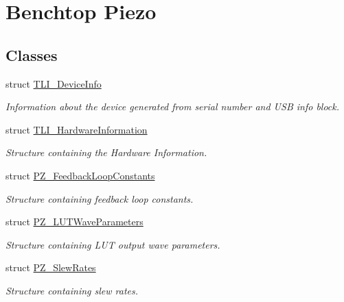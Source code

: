 \hypertarget{group___benchtop_piezo}{}\section{Benchtop Piezo}
\label{group___benchtop_piezo}
\subsection*{Classes}
\begin{DoxyCompactItemize}
\item 
struct \hyperlink{struct_t_l_i___device_info}{T\+L\+I\+\_\+\+Device\+Info}
\begin{DoxyCompactList}\small\item\em Information about the device generated from serial number and U\+SB info block. \end{DoxyCompactList}\item 
struct \hyperlink{struct_t_l_i___hardware_information}{T\+L\+I\+\_\+\+Hardware\+Information}
\begin{DoxyCompactList}\small\item\em Structure containing the Hardware Information. \end{DoxyCompactList}\item 
struct \hyperlink{struct_p_z___feedback_loop_constants}{P\+Z\+\_\+\+Feedback\+Loop\+Constants}
\begin{DoxyCompactList}\small\item\em Structure containing feedback loop constants. \end{DoxyCompactList}\item 
struct \hyperlink{struct_p_z___l_u_t_wave_parameters}{P\+Z\+\_\+\+L\+U\+T\+Wave\+Parameters}
\begin{DoxyCompactList}\small\item\em Structure containing L\+UT output wave parameters. \end{DoxyCompactList}\item 
struct \hyperlink{struct_p_z___slew_rates}{P\+Z\+\_\+\+Slew\+Rates}
\begin{DoxyCompactList}\small\item\em Structure containing slew rates. \end{DoxyCompactList}\end{DoxyCompactItemize}
